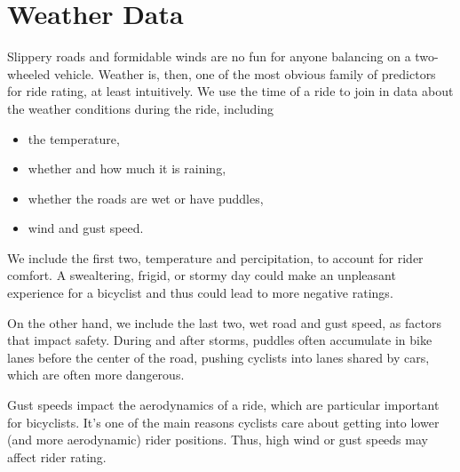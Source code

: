 \documentclass[12pt,twoside]{reedthesis}
\providecommand{\tightlist}{%
  \setlength{\itemsep}{0pt}\setlength{\parskip}{0pt}}
\begin{document}
  \section{Weather Data}\label{weather-data}
  
  Slippery roads and formidable winds are no fun for anyone balancing on a
  two-wheeled vehicle. Weather is, then, one of the most obvious family of
  predictors for ride rating, at least intuitively. We use the time of a
  ride to join in data about the weather conditions during the ride,
  including
  
  \begin{itemize}
  \tightlist
  \item
    the temperature,
  \item
    whether and how much it is raining,
  \item
    whether the roads are wet or have puddles,
  \item
    wind and gust speed.
  \end{itemize}
  
  We include the first two, temperature and percipitation, to account for
  rider comfort. A swealtering, frigid, or stormy day could make an
  unpleasant experience for a bicyclist and thus could lead to more
  negative ratings.
  
  On the other hand, we include the last two, wet road and gust speed, as
  factors that impact safety. During and after storms, puddles often
  accumulate in bike lanes before the center of the road, pushing cyclists
  into lanes shared by cars, which are often more dangerous.
  
  Gust speeds impact the aerodynamics of a ride, which are particular
  important for bicyclists. It's one of the main reasons cyclists care
  about getting into lower (and more aerodynamic) rider positions. Thus,
  high wind or gust speeds may affect rider rating.
  
\end{document}

